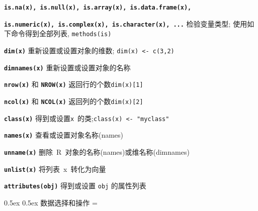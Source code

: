 \documentclass[landscape]{article}
\makeatletter
\renewcommand\section{\@startsection{section}{1}{0mm}%
                                     {0.5ex}%
                                     {0.5ex}%
                                {\color{black}\normalfont\large\bfseries}}
\newcommand{\code}{\texttt}
\newcommand{\bcode}[1]{\texttt{\textbf{#1}}}
\makeatother
\begin{document}
\begin{multicols*}{3}
\bcode{is.na(x), is.null(x), is.array(x), is.data.frame(x),}

\bcode{is.numeric(x), is.complex(x), is.character(x), ...} 检验变量类型;
使用如下命令得到全部列表,  \code{methods(is)}


\bcode{dim(x)} 重新设置或设置对象的维数;
\code{dim(x) <- c(3,2)}

\bcode{dimnames(x)} 重新设置或设置对象的名称

\bcode{nrow(x)} 和 \bcode{NROW(x)} 返回行的个数\code{dim(x)[1]}

\bcode{ncol(x)} 和 \bcode{NCOL(x)} 返回列的个数\code{dim(x)[2]}

\bcode{class(x)} 得到或设置\code{x}~的类;\code{class(x) <- "myclass"}


\bcode{names(x)}  查看或设置对象名称(names)

\bcode{unname(x)}   删除~R~对象的名称(names)或维名称(dimnames)

\bcode{unlist(x)}   将列表~x~转化为向量


\bcode{attributes(obj)} 得到或设置 \code{obj} 的属性列表




\section{数据选择和操作}
\everypar={\hangindent=9mm}


\end{multicols*}
\end{document}
